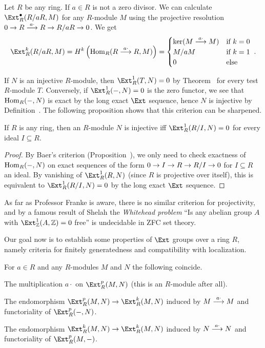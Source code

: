 \documentclass[a4paper,parskip=half,numbers=enddot, DIV=12]{scrreprt}
\begin{document}
\begin{example*}
	Let $R$ be any ring. If $a\in R$ is not a zero divisor. We can calculate $\Ext_R^\bullet(R/aR,M)$ for any $R$-module $M$ using the projective resolution $0\morphism R\morphism[ a\cdot]R\morphism R/aR\morphism 0$. We get
	\begin{align*}
		\Ext_R^k(R/aR,M)=H^k\left(\Hom_R(R\morphism[ a\cdot]R,M)\right)=\begin{cases}
			\ker(M\morphism[ a\cdot]M) & \text{if }k=0\\
			M/aM & \text{if }k=1\\
			0 & \text{else}
		\end{cases}\;.
	\end{align*}
\end{example*}
If $N$ is an injective $R$-module, then $\Ext_R^1(T,N)=0$ by Theorem~ for every test $R$-module $T$. Conversely, if $\Ext_R^1(-,N)=0$ is the zero functor, we see that $\operatorname{Hom}_R(-,N)$ is exact by the long exact $\Ext$ sequence, hence $N$ is injective by Definition~. The following proposition shows that this criterion can be sharpened.
\begin{prop}
	If $R$ is any ring, then an $R$-module $N$ is injective iff $\Ext_R^1(R/I,N)=0$ for every ideal $I\subseteq R$.
\end{prop}
\begin{proof}
	By Baer's criterion (Proposition~), we only need to check exactness of $\operatorname{Hom}_R(-,N)$ on exact sequences of the form $0\morphism I\morphism R\morphism R/I\morphism 0$ for $I\subseteq R$ an ideal. By vanishing of $\Ext_R^1(R,N)$ (since $R$ is projective over itself), this is equivalent to $\Ext_R^1(R/I,N)=0$ by the long exact $\Ext$ sequence.
\end{proof}
\begin{rem*}
	As far as Professor Franke is aware, there is no similar criterion for projectivity, and by a famous result of Shelah the \emph{Whitehead problem} ``Is any abelian group $A$ with $\Ext_\IZ^1(A,\IZ)=0$ free'' is undecidable in ZFC set theory.
\end{rem*}
Our goal now is to establish some properties of $\Ext$ groups over a ring $R$, namely criteria for finitely generatedness and compatibility with localization.
\begin{fact}
	For $a\in R$ and any $R$-modules $M$ and $N$ the following coincide.
	\begin{alphanumerate}
		\item The multiplication $a\cdot $ on $\Ext_R^p(M,N)$ (this is an $R$-module after all).
		\item The endomorphism $\Ext_R^p(M,N)\morphism\Ext_R^k(M,N)$ induced by $M\morphism[ a\cdot]M$ and functoriality of $\Ext_R^p(-,N)$.
		\item The endomorphism $\Ext_R^k(M,N)\morphism\Ext_R^k(M,N)$ induced by $N\morphism[ a\cdot]N$ and functoriality of $\Ext_R^p(M,-)$.
	\end{alphanumerate}
\end{fact}
\end{document}
